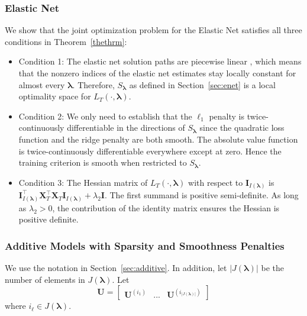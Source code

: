 \documentclass[12pt,letterpaper]{article}
\begin{document}
\subsubsection{Elastic Net}\label{enet_conditions}
We show that the joint optimization problem for the Elastic Net satisfies all three conditions in Theorem~\ref{thethrm}:
\begin{itemize}
\item[] Condition 1: The elastic net solution paths are piecewise linear \citep{zou2003regression}, which means that the nonzero indices of the elastic net estimates stay locally constant for almost every $\boldsymbol{\lambda}$. Therefore, $S_{\boldsymbol{\lambda}}$ as defined in Section~\ref{sec:enet}  is a local optimality space for $L_T(\cdot, \boldsymbol{\lambda})$.
\item[] Condition 2: We only need to establish that the $\ell_1$ penalty is twice-continuously differentiable in the directions of $S_{\boldsymbol{\lambda}}$ since the quadratic loss function and the ridge penalty are both smooth. The absolute value function is twice-continuously differentiable everywhere except at zero. Hence the training criterion is smooth when restricted to $S_{\boldsymbol{\lambda}}$.
\item[] Condition 3: The Hessian matrix of $L_T(\cdot, \boldsymbol{\lambda})$ with respect to $\boldsymbol I_{I(\boldsymbol \lambda)}$ is $\boldsymbol I_{I(\boldsymbol \lambda)}^\top \boldsymbol{X}_{T}^\top \boldsymbol{X}_{T} \boldsymbol I_{I(\boldsymbol \lambda)} + \lambda_2 \boldsymbol{I}$. The first summand is positive semi-definite. As long as $\lambda_2 > 0$, the contribution of the identity matrix ensures the Hessian is positive definite.
\end{itemize}

\subsubsection{Additive Models with Sparsity and Smoothness Penalties}
\label{sec_appendix:sparse_add_models}
We use the notation in Section~\ref{sec:additive}. 
In addition, let  $|J(\boldsymbol{\lambda})|$ be the number of elements in $J(\boldsymbol{\lambda})$. Let
\begin{equation}
\boldsymbol{U} = \begin{bmatrix}
\boldsymbol {U}^{(i_1)} & ... & \boldsymbol {U}^{(i_{|J(\boldsymbol \lambda)|})}
\end{bmatrix}
\end{equation}
where $i_\ell \in J(\boldsymbol \lambda)$. 
\end{document}
